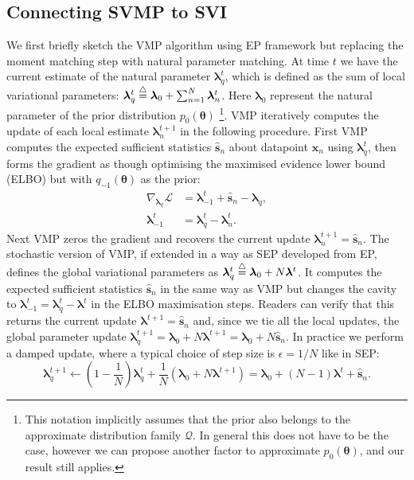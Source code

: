 \documentclass{article} %
\begin{document}
\subsection{Connecting SVMP to SVI}
We first briefly sketch the VMP algorithm using EP framework but replacing the moment matching step with natural parameter matching. At time $t$ we have the current estimate of the natural parameter $\bm{\lambda}_q^t$, which is defined as the sum of local variational parameters:
%
$\bm{\lambda}_q^t \buildrel\triangle\over = \bm{\lambda}_0 + \sum_{n=1}^N \bm{\lambda}_n^t$.
%
Here $\bm{\lambda}_0$ represent the natural parameter of the prior distribution $p_0(\bm{\theta})$ \footnote{This notation implicitly assumes that the prior also belongs to the approximate distribution family $\mathcal{Q}$. In general this does not have to be the case, however we can propose another factor to approximate $p_0(\bm{\theta})$, and our result still applies.}. VMP iteratively computes the update of each local estimate $\bm{\lambda}_n^{t+1}$ in the following procedure. First VMP computes the expected sufficient statistics $\hat{\bm{s}}_n$ about datapoint $\bm{x}_n$ using $\bm{\lambda}_q^t$, then forms the gradient as though optimising the maximised evidence lower bound (ELBO) but with $q_{-1}(\bm{\theta})$ as the prior:
\begin{align}
\nabla_{\bm{\lambda}_q} \mathcal{L} &= \bm{\lambda}_{-1}^t + \hat{\bm{s}}_n - \bm{\lambda}_q, \\
\bm{\lambda}_{-1}^t &= \bm{\lambda}_q^t - \bm{\lambda}_{n}^t.
\end{align}
Next VMP zeros the gradient and recovers the current update $\bm{\lambda}_n^{t+1} = \hat{\bm{s}}_n$. The stochastic version of VMP, if extended in a way as SEP developed from EP, defines the global variational parameters as $\bm{\lambda}_q^t \buildrel\triangle\over = \bm{\lambda}_0 + N \bm{\lambda}^t$. It computes the expected sufficient statistics $\hat{\bm{s}}_n$ in the same way as VMP but changes the cavity to $\bm{\lambda}_{-1}^t = \bm{\lambda}_q^t - \bm{\lambda}^t$ in the ELBO maximisation steps. Readers can verify that this returns the current update $\bm{\lambda}^{t+1} = \hat{\bm{s}}_n$ and, since we tie all the local updates, the global parameter update $\bm{\lambda}_q^{t+1} = \bm{\lambda}_0 + N \bm{\lambda}^{t+1} = \bm{\lambda}_0 + N \hat{\bm{s}}_n$. In practice we perform a damped update, where a typical choice of step size is $\epsilon = 1/N$ like in SEP:
\begin{equation}
\bm{\lambda}_q^{t+1} \leftarrow (1 - \frac{1}{N}) \bm{\lambda}_q^t + \frac{1}{N}(\bm{\lambda}_0 + N \bm{\lambda}^{t+1}) = \bm{\lambda}_0 + (N-1) \bm{\lambda}^t + \hat{\bm{s}}_n.
\end{equation} 
\end{document}
